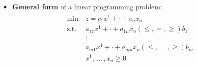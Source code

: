 \documentclass[english]{article}
\begin{document}
\begin{itemize}
  \item \textbf{General form} of a linear programming problem:
        \begin{gather*}
          \begin{aligned}
            \min \         & z = c_1 x^1 + \cdot + c_n x_n                                    \\
            \text{s.t.} \  & a_{11} x^1 + \cdot + a_{1n} x_n \left( \leq, =, \geq \right) b_1 \\
                           & \vdots                                                           \\
                           & a_{m1} x^1 + \cdot + a_{mn} x_n \left( \leq, =, \geq \right) b_m \\
                           & x^1, \, \ldots \,, x_n \geq 0
          \end{aligned}
        \end{gather*}


\end{itemize}
\end{document}
